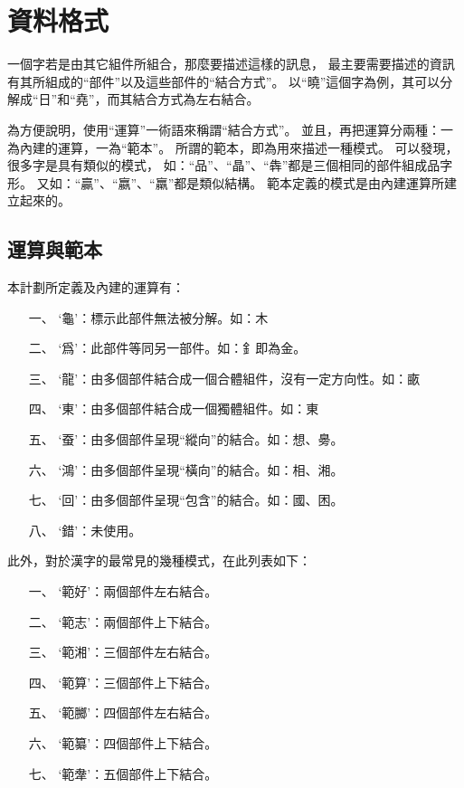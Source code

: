 ﻿\chapter{資料格式}

一個字若是由其它組件所組合，那麼要描述這樣的訊息，
最主要需要描述的資訊有其所組成的``部件''以及這些部件的``結合方式''。
以``曉''這個字為例，其可以分解成``日''和``堯''，而其結合方式為左右結合。

為方便說明，使用``運算''一術語來稱謂``結合方式''。
並且，再把運算分兩種：一為內建的運算，一為``範本''。
所謂的範本，即為用來描述一種模式。
可以發現，很多字是具有類似的模式，
如：``品''、``晶''、``犇''都是三個相同的部件組成品字形。
又如：``贏''、``嬴''、``羸''都是類似結構。
範本定義的模式是由內建運算所建立起來的。

\section{運算與範本}
本計劃所定義及內建的運算有：
\begin{enumerate}
\item[一、]`龜'：標示此部件無法被分解。如：木
\item[二、]`爲'：此部件等同另一部件。如：釒即為金。
\item[三、]`龍'：由多個部件結合成一個合體組件，沒有一定方向性。如：畞
\item[四、]`東'：由多個部件結合成一個獨體組件。如：東
\item[五、]`蚕'：由多個部件呈現``縱向''的結合。如：想、臱。
\item[六、]`鴻'：由多個部件呈現``橫向''的結合。如：相、湘。
\item[七、]`回'：由多個部件呈現``包含''的結合。如：國、困。
\item[八、]`錯'：未使用。
\end{enumerate}

此外，對於漢字的最常見的幾種模式，在此列表如下：
\begin{enumerate}
\item[一、]`範好'：兩個部件左右結合。
\item[二、]`範志'：兩個部件上下結合。
\item[三、]`範湘'：三個部件左右結合。
\item[四、]`範算'：三個部件上下結合。
\item[五、]`範膷'：四個部件左右結合。
\item[六、]`範纂'：四個部件上下結合。
\item[七、]`範舝'：五個部件上下結合。
\end{enumerate}

